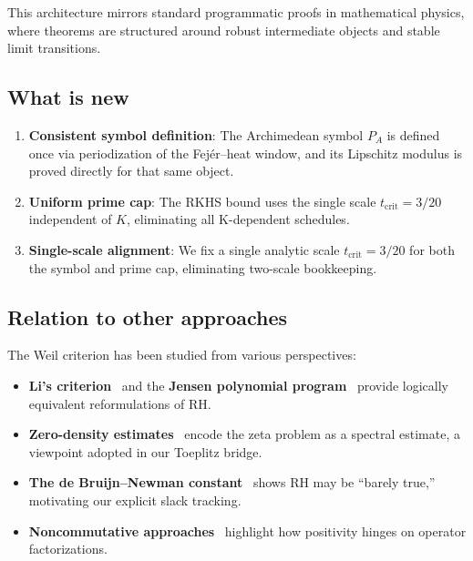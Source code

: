 \documentclass[11pt,a4paper]{article}
\theoremstyle{definition}
\begin{document}
This architecture mirrors standard programmatic proofs in mathematical physics, where theorems are structured around robust intermediate objects and stable limit transitions.

\subsection{What is new}

\begin{enumerate}
\item \textbf{Consistent symbol definition}: The Archimedean symbol $P_A$ is defined once via periodization of the Fej\'er--heat window, and its Lipschitz modulus is proved directly for that same object.

\item \textbf{Uniform prime cap}: The RKHS bound uses the single scale $t_{\mathrm{crit}} = 3/20$ independent of $K$, eliminating all K-dependent schedules.

\item \textbf{Single-scale alignment}: We fix a single analytic scale $t_{\mathrm{crit}} = 3/20$ for both the symbol and prime cap, eliminating two-scale bookkeeping.
\end{enumerate}

\subsection{Relation to other approaches}

The Weil criterion has been studied from various perspectives:

\begin{itemize}
\item \textbf{Li's criterion}~\cite{Li1997} and the \textbf{Jensen polynomial program}~\cite{GriffinOnoRolenZagier2019} provide logically equivalent reformulations of RH.

\item \textbf{Zero-density estimates}~\cite{GuthMaynard2024} encode the zeta problem as a spectral estimate, a viewpoint adopted in our Toeplitz bridge.

\item \textbf{The de Bruijn--Newman constant}~\cite{RodgersTao2020} shows RH may be ``barely true,'' motivating our explicit slack tracking.

\item \textbf{Noncommutative approaches}~\cite{ConnesMarcolli2008} highlight how positivity hinges on operator factorizations.
\end{itemize}
\end{document}
